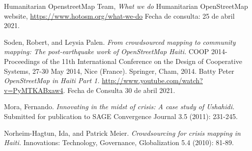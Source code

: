 \begin{thebibliography}{1}
   Humanitarian OpenstreetMap Team, {\em What we do} Humanitarian OpenStreetMap website, \url{https://www.hotosm.org/what-we-do} Fecha de consulta: 25 de abril 2021.

   Soden, Robert, and Leysia Palen. {\em From crowdsourced mapping to community mapping: The post-earthquake work of OpenStreetMap Haiti.} COOP 2014-Proceedings of the 11th International Conference on the Design of Cooperative Systems, 27-30 May 2014, Nice (France). Springer, Cham, 2014.
   Batty Peter  {\em OpenStreetMap in Haiti Part 1.} \url{http://www.youtube.com/watch?v=PyMTKABxaw4}. Fecha de Consulta 30 de abril 2021.

   Mora, Fernando. {\em Innovating in the midst of crisis: A case study of Ushahidi.} Submitted for publication to SAGE Convergence Journal 3.5 (2011): 231-245.

   Norheim-Hagtun, Ida, and Patrick Meier. {\em Crowdsourcing for crisis mapping in Haiti.} Innovations: Technology, Governance, Globalization 5.4 (2010): 81-89.

\end{thebibliography}
